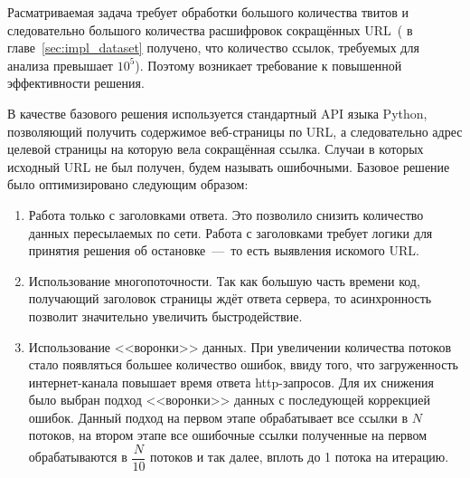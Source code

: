         Расматриваемая задача требует обработки большого количества твитов и следовательно большого количества расшифровок сокращённых URL~(
        в главе~\ref{sec:impl_dataset} получено, что количество ссылок, требуемых для анализа превышает $10^5$).
        Поэтому возникает требование к повышенной эффективности решения.

        В качестве базового решения используется стандартный API языка Python, позволяющий получить содержимое веб-страницы по URL,
        а следовательно адрес целевой страницы на которую вела сокращённая ссылка. Случаи в которых исходный URL не был получен, будем называть ошибочными.
        Базовое решение было оптимизировано следующим образом:
        \begin{enumerate}
            \item Работа только с заголовками ответа. Это позволило снизить количество данных пересылаемых по сети.
            Работа с заголовками требует логики для принятия решения об остановке~---~то есть выявления искомого URL.
            \item Использование многопоточности.
            Так как большую часть времени код, получающий заголовок страницы ждёт ответа сервера, то асинхронность позволит значительно увеличить быстродействие.
            \item Использование <<воронки>> данных. При увеличении количества потоков стало появляться большее количество ошибок,
            ввиду того, что загруженность интернет-канала повышает время ответа http-запросов.
            Для их снижения было выбран подход <<воронки>> данных с последующей коррекцией ошибок. Данный подход на первом этапе обрабатывает все ссылки в $N$ потоков,
            на втором этапе все ошибочные ссылки полученные на первом обрабатываются в $\dfrac{N}{10}$ потоков и так далее, вплоть до 1 потока на итерацию.
        \end{enumerate}
%

